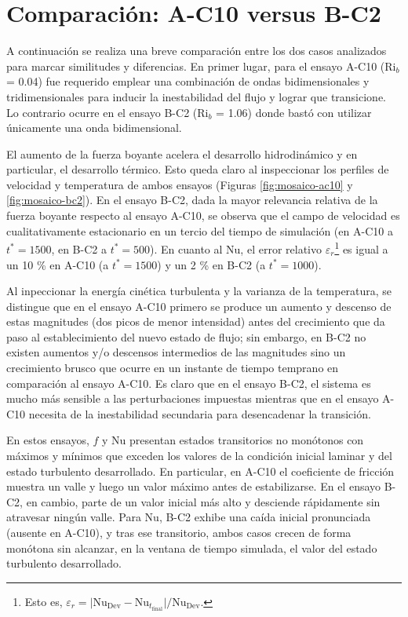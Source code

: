 \section{Comparación: A-C10 versus B-C2}

A continuación se realiza una breve comparación entre los dos casos analizados para \linebreak marcar similitudes y diferencias. En primer lugar, para el ensayo A-C10 (Ri$_b$ = 0.04) fue requerido emplear una combinación de ondas bidimensionales y tridimensionales para inducir la inestabilidad del flujo y lograr que transicione. Lo contrario ocurre en el ensayo B-C2 \linebreak (Ri$_b$ = 1.06) donde bastó con utilizar únicamente una onda bidimensional.

El aumento de la fuerza boyante acelera el desarrollo hidrodinámico y en particular, el desarrollo térmico. Esto queda claro al inspeccionar los perfiles de velocidad y temperatura de ambos ensayos (Figuras \ref{fig:mosaico-ac10} y \ref{fig:mosaico-bc2}). En el ensayo B-C2, dada la mayor relevancia relativa de la fuerza boyante respecto al ensayo A-C10, se observa que el campo de velocidad es cualitativamente estacionario en un tercio del tiempo de simulación (en A-C10 a $t^* = 1500$, en B-C2 a $t^* = 500$). En cuanto al Nu, el error relativo $\varepsilon_r$\footnote{Esto es, $\varepsilon_r =  \vert \text{Nu}_{\text{Dev}} - \text{Nu}_{t_{\text{final}}}  \vert / \text{Nu}_{\text{Dev}}$.} es igual a un 10 \% en A-C10 (a $t^* = 1500$) y un 2 \% en B-C2 (a $t^* = 1000$).


Al inpeccionar la energía cinética turbulenta y la varianza de la temperatura, se distingue que en el ensayo A-C10 primero se produce un aumento y descenso de estas magnitudes (dos picos de menor intensidad) antes del crecimiento que da paso al establecimiento del nuevo estado de flujo; sin embargo, en B-C2 no existen aumentos y/o descensos intermedios de las magnitudes sino un crecimiento brusco que ocurre en un instante de tiempo temprano en comparación al ensayo A-C10. Es claro que en el ensayo B-C2, el sistema es mucho más sensible a las perturbaciones impuestas mientras que en el ensayo A-C10 necesita de la inestabilidad secundaria para desencadenar la transición. 

En estos ensayos, $f$ y Nu presentan estados transitorios no monótonos con máximos y mínimos que exceden los valores de la condición inicial laminar y del estado turbulento \linebreak desarrollado. En particular, en A-C10 el coeficiente de fricción muestra un valle y luego un valor máximo antes de estabilizarse. En el ensayo B-C2, en cambio, parte de un valor inicial más alto y desciende rápidamente sin atravesar ningún valle. Para $\text{Nu}$, B-C2 exhibe una caída inicial pronunciada (ausente en A-C10), y tras ese transitorio, ambos casos crecen de \linebreak forma monótona sin alcanzar, en la ventana de tiempo simulada, el valor del estado \linebreak turbulento desarrollado.

